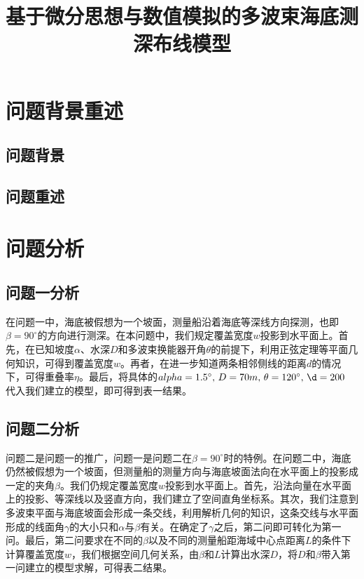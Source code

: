 \documentclass{article}
\title{基于微分思想与数值模拟的多波束海底测深布线模型}
\begin{document}
	\newcommand\degree{^\circ}
	\maketitle
	
	\begin{abstract}
		
	\end{abstract}
\tableofcontents
	
\section{问题背景重述}
\subsection{问题背景}
\subsection{问题重述}

\section{问题分析}
\subsection{问题一分析}
	在问题一中，海底被假想为一个坡面，测量船沿着海底等深线方向探测，也即$\beta=90\degree$的方向进行测深。在本问题中，我们规定覆盖宽度$w$投影到水平面上。首先，在已知坡度$\alpha$、水深$D$和多波束换能器开角$\theta$的前提下，利用正弦定理等平面几何知识，可得到覆盖宽度$w$。再者，在进一步知道两条相邻侧线的距离$d$的情况下，可得重叠率$\eta$。最后，将具体的$alpha=1.5 \degree,\, D=70m,\,\theta=120\degree, \, \d=200 $ 代入我们建立的模型，即可得到表一结果。
	
\subsection{问题二分析}
	问题二是问题一的推广，问题一是问题二在$\beta=90\degree$时的特例。在问题二中，海底仍然被假想为一个坡面，但测量船的测量方向与海底坡面法向在水平面上的投影成一定的夹角$\beta$。我们仍规定覆盖宽度$w$投影到水平面上。首先，沿法向量在水平面上的投影、等深线以及竖直方向，我们建立了空间直角坐标系。其次，我们注意到多波束平面与海底坡面会形成一条交线，利用解析几何的知识，这条交线与水平面形成的线面角$\gamma$的大小只和$\alpha$与$\beta$有关。在确定了$\gamma$之后，第二问即可转化为第一问。最后，第二问要求在不同的$\beta$以及不同的测量船距海域中心点距离$L$的条件下计算覆盖宽度$w$，我们根据空间几何关系，由$\beta$和$L$计算出水深$D$，将$D$和$\beta$带入第一问建立的模型求解，可得表二结果。
\end{document}
